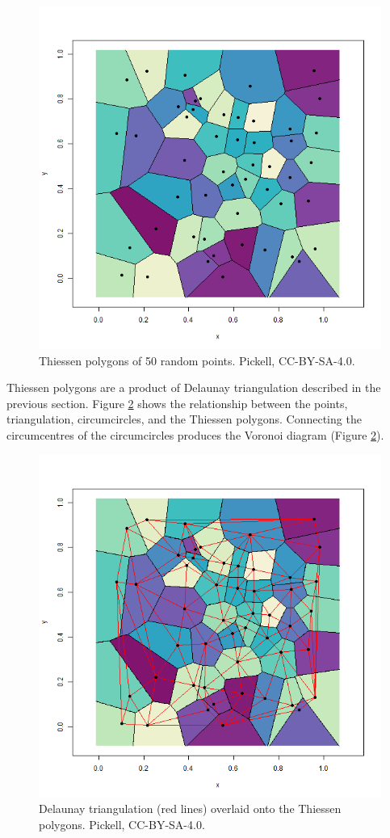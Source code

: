 \documentclass[
]{book}
\begin{document}
\begin{figure}
\includegraphics[width=0.75\linewidth]{images/07-2d-thiessen-polygons} \caption{Thiessen polygons of 50 random points. Pickell, CC-BY-SA-4.0.}\label{fig:7-2d-thiessen-polygons}
\end{figure}

Thiessen polygons are a product of Delaunay triangulation described in the previous section. Figure \ref{fig:7-delaunay-triangulation-thiessen-polygons} shows the relationship between the points, triangulation, circumcircles, and the Thiessen polygons. Connecting the circumcentres of the circumcircles produces the Voronoi diagram (Figure \ref{fig:7-delaunay-triangulation-thiessen-polygons}).

\begin{figure}
\includegraphics[width=0.75\linewidth]{images/07-delaunay-triangulation-thiessen-polygons} \caption{Delaunay triangulation (red lines) overlaid onto the Thiessen polygons. Pickell, CC-BY-SA-4.0.}\label{fig:7-delaunay-triangulation-thiessen-polygons}
\end{figure}
\end{document}
